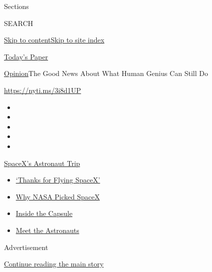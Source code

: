 Sections

SEARCH

\protect\hyperlink{site-content}{Skip to
content}\protect\hyperlink{site-index}{Skip to site index}

\href{https://myaccount.nytimes3xbfgragh.onion/auth/login?response_type=cookie\&client_id=vi}{}

\href{https://www.nytimes3xbfgragh.onion/section/todayspaper}{Today's
Paper}

\href{/section/opinion}{Opinion}\textbar{}The Good News About What Human
Genius Can Still Do

\url{https://nyti.ms/3i8d1UP}

\begin{itemize}
\item
\item
\item
\item
\item
\end{itemize}

\href{https://www.nytimes3xbfgragh.onion/2020/08/02/science/spacex-astronauts-splashdown.html?action=click\&pgtype=Article\&state=default\&region=TOP_BANNER\&context=storylines_menu}{SpaceX's
Astronaut Trip}

\begin{itemize}
\tightlist
\item
  \href{https://www.nytimes3xbfgragh.onion/2020/08/02/science/spacex-astronauts-splashdown.html?action=click\&pgtype=Article\&state=default\&region=TOP_BANNER\&context=storylines_menu}{`Thanks
  for Flying SpaceX'}
\item
  \href{https://www.nytimes3xbfgragh.onion/2020/05/26/science/spacex-launch-nasa.html?action=click\&pgtype=Article\&state=default\&region=TOP_BANNER\&context=storylines_menu}{Why
  NASA Picked SpaceX}
\item
  \href{https://www.nytimes3xbfgragh.onion/interactive/2020/05/26/science/spacex-nasa.html?action=click\&pgtype=Article\&state=default\&region=TOP_BANNER\&context=storylines_menu}{Inside
  the Capsule}
\item
  \href{https://www.nytimes3xbfgragh.onion/2020/05/27/science/bob-behnken-doug-hurley.html?action=click\&pgtype=Article\&state=default\&region=TOP_BANNER\&context=storylines_menu}{Meet
  the Astronauts}
\end{itemize}

Advertisement

\protect\hyperlink{after-top}{Continue reading the main story}

